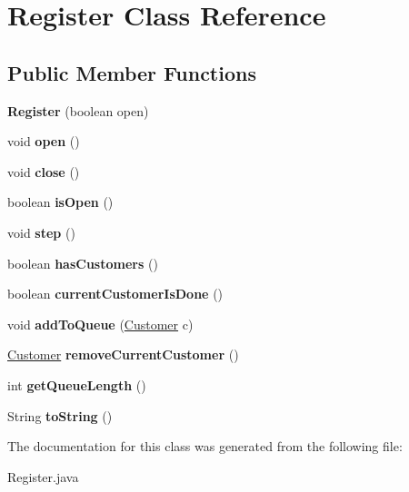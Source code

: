 \hypertarget{class_register}{}\section{Register Class Reference}
\label{class_register}
\subsection*{Public Member Functions}
\begin{DoxyCompactItemize}
\item 
\hypertarget{class_register_aca7ec23bf8014026685d7b28cc0cdc83}{}{\bfseries Register} (boolean open)\label{class_register_aca7ec23bf8014026685d7b28cc0cdc83}

\item 
\hypertarget{class_register_ac02a67e31b492873afbbc5ce2840d7fb}{}void {\bfseries open} ()\label{class_register_ac02a67e31b492873afbbc5ce2840d7fb}

\item 
\hypertarget{class_register_a6ff4bf08b8934138ae25ebdbdaa9a968}{}void {\bfseries close} ()\label{class_register_a6ff4bf08b8934138ae25ebdbdaa9a968}

\item 
\hypertarget{class_register_a892ac0d31549027d495948c82ff3ae7a}{}boolean {\bfseries is\+Open} ()\label{class_register_a892ac0d31549027d495948c82ff3ae7a}

\item 
\hypertarget{class_register_a71c5705fbba0bf88661cf3e7dd3b10d1}{}void {\bfseries step} ()\label{class_register_a71c5705fbba0bf88661cf3e7dd3b10d1}

\item 
\hypertarget{class_register_ae7c8276901821f6e866472afa54441a7}{}boolean {\bfseries has\+Customers} ()\label{class_register_ae7c8276901821f6e866472afa54441a7}

\item 
\hypertarget{class_register_a5feae9eebb986ff4798ba79a5b1f0c0a}{}boolean {\bfseries current\+Customer\+Is\+Done} ()\label{class_register_a5feae9eebb986ff4798ba79a5b1f0c0a}

\item 
\hypertarget{class_register_a9ed3f3799b5ea459d6df53f82b54e69f}{}void {\bfseries add\+To\+Queue} (\hyperlink{class_customer}{Customer} c)\label{class_register_a9ed3f3799b5ea459d6df53f82b54e69f}

\item 
\hypertarget{class_register_a09213fdfd15a583e5c6fe0bbe8505da3}{}\hyperlink{class_customer}{Customer} {\bfseries remove\+Current\+Customer} ()\label{class_register_a09213fdfd15a583e5c6fe0bbe8505da3}

\item 
\hypertarget{class_register_a447023dcde7ef511a8222805114017e5}{}int {\bfseries get\+Queue\+Length} ()\label{class_register_a447023dcde7ef511a8222805114017e5}

\item 
\hypertarget{class_register_ab27bc35d9b9514d42378b23193bf5dee}{}String {\bfseries to\+String} ()\label{class_register_ab27bc35d9b9514d42378b23193bf5dee}

\end{DoxyCompactItemize}


The documentation for this class was generated from the following file\+:\begin{DoxyCompactItemize}
\item 
Register.\+java\end{DoxyCompactItemize}
